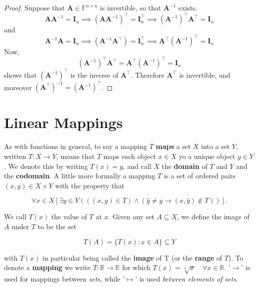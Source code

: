 \documentclass{article}
\begin{document}
\begin{proof}
    Suppose that $\mathbf{A}\in \mathbb{F}^{n\times n}$ is invertible, so that $\mathbf{A}^{-1}$ exists.
    \begin{equation*}
        \mathbf{A}\mathbf{A}^{-1} = \mathbf{I}_n \implies (\mathbf{A}\mathbf{A}^{-1})^\top = \mathbf{I}_n^\top \implies (\mathbf{A}^{-1})^\top \mathbf{A}^\top = \mathbf{I}_n 
    \end{equation*}
    and 
    \begin{equation*}
        \mathbf{A}^{-1}\mathbf{A} = \mathbf{I}_n \implies (\mathbf{A}^{-1}\mathbf{A}^\top) = \mathbf{I}_n^\top \implies \mathbf{A}^\top (\mathbf{A}^{-1})^\top  = \mathbf{I}_n 
    \end{equation*}
    Now, 
    \begin{equation*}
        (\mathbf{A}^{-1})^\top \mathbf{A}^\top = \mathbf{A}^\top (\mathbf{A}^{-1})^\top = \mathbf{I}_n
    \end{equation*}
    shows that $(\mathbf{A}^{-1})^\top$ is the inverse of $\mathbf{A}^\top$. Therefore $\mathbf{A}^\top$ is invertible, and moreover $(\mathbf{A}^\top)^{-1} = (\mathbf{A}^{-1})^\top$.
\end{proof}

\section{Linear Mappings}
As with functions in general, to say a mapping $T$ \textbf{maps} a set $X$ into a set $Y$, written $T: X \rightarrow Y$, means that $T$ maps each object $x\in X$ yo a unique object $y \in Y$. We denote this by writing $T(x) = y$, and call $X$ the \textbf{domain} of $T$ and $Y$ and the \textbf{codomain}. A little more formally a mapping $T$ is a set of ordered pairs $(x,y) \in X \times Y$ with the property that 

\begin{equation*}
    \forall x \in X [\exists y \in Y (((x,y) \in T) \wedge (\hat{y} \neq y \rightarrow(x, \hat{y}) \notin T))].
\end{equation*}

\noindent We call $T(x)$ the value of $T$ at $x$. Given any set $A \subseteq X$, we define the image of $A$ under $T$ to be the set 

\begin{equation*}
    T(A) = \{T(x): x \in A \} \subseteq Y
\end{equation*}

\noindent with $T(x)$ in particular being called the \textbf{image} of T (or the \textbf{range} of $T$). To denote a \textbf{mapping} we write $T:\mathbb{R}\rightarrow \mathbb{R}$ for which $T(x) = \sqrt[3]{x} \quad \forall x \in \mathbb{R}$. '$\rightarrow$' is used for mappings between \textit{sets}, while '$\mapsto$' is used \textit{between elements of sets}.
\end{document}
